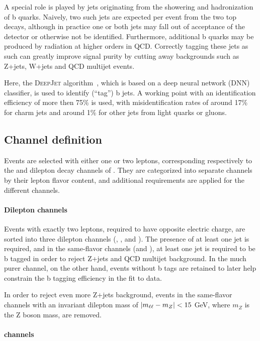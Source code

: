 A special role is played by jets originating from the showering and hadronization of b quarks. Naively, two such jets are expected per \ttbar event from the two top decays, although in practice one or both jets may fall out of acceptance of the detector or otherwise not be identified. Furthermore, additional b quarks may be produced by radiation at higher orders in QCD. Correctly tagging these jets as such can greatly improve signal purity by cutting away backgrounds such as Z+jets, W+jets and QCD multijet events.

Here, the \textsc{DeepJet} algorithm~\cite{DeepJet:2020,CMS:BTV-16-002}, which is based on a deep neural network (DNN) classifier, is used to identify (``tag'') b jets. A working point with an identification efficiency of more then 75\% is used, with misidentification rates of around 17\% for charm jets and around 1\% for other jets from light quarks or gluons.

\subsection{Channel definition}
\label{sec:ttxs:channels}

Events are selected with either one or two leptons, corresponding respectively to the \ljets and dilepton decay channels of \ttbar. They are categorized into separate channels by their lepton flavor content, and additional requirements are applied for the different channels. 

\paragraph{Dilepton channels}

Events with exactly two leptons, required to have opposite electric charge, are sorted into three dilepton channels (\emu, \ee, and \mumu). The presence of at least one jet is required, and in the same-flavor channels (\ee and \mumu), at least one jet is required to be b tagged in order to reject Z+jets and QCD multijet background. In the much purer \emu channel, on the other hand, events without b tags are retained to later help constrain the b tagging efficiency in the fit to data.

In order to reject even more Z+jets background, events in the same-flavor channels with an invariant dilepton mass of $| m_{\ell\ell} - m_Z | < 15$ GeV, where $m_Z$ is the Z boson mass, are removed.

\paragraph{\ljets channels}


